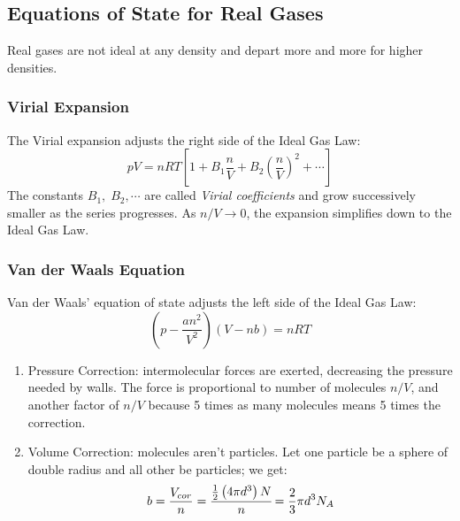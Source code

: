 \documentclass[../PhysicsFormulae.tex]{subfiles}
\begin{document}
\subsection{Equations of State for Real Gases}
Real gases are not ideal at any density and depart more and more for higher densities. 

\subsubsection{Virial Expansion}
The Virial expansion adjusts the right side of the Ideal Gas Law: 
\[ pV = nRT \left[1 + B_1 \frac{n}{V} + B_2 \left(\frac{n}{V}\right)^2 + \cdots \right] \]
The constants $B_1, \; B_2, \cdots$ are called \textit{Virial coefficients} and grow successively smaller as the series progresses. As $n/V\rightarrow0$, the expansion simplifies down to the Ideal Gas Law. 

\subsubsection{Van der Waals Equation}
Van der Waals' equation of state adjusts the left side of the Ideal Gas Law: 
\[ \left(p - \frac{an^2}{V^2}\right) (V-nb) = nRT \]
\begin{enumerate}
	\item Pressure Correction: intermolecular forces are exerted, decreasing the pressure needed by walls. The force is proportional to number of molecules $n/V$, and another factor of $n/V$ because 5 times as many molecules means 5 times the correction. 
	\item Volume Correction: molecules aren't particles. Let one particle be a sphere of double radius and all other be particles; we get: 
	\[ b = \frac{V_{cor}}{n} = \cfrac{\frac{1}{2}\left(4\pi d^3\right)N}{n} = \frac{2}{3}\pi d^3 N_A \]
\end{enumerate}
\end{document}
